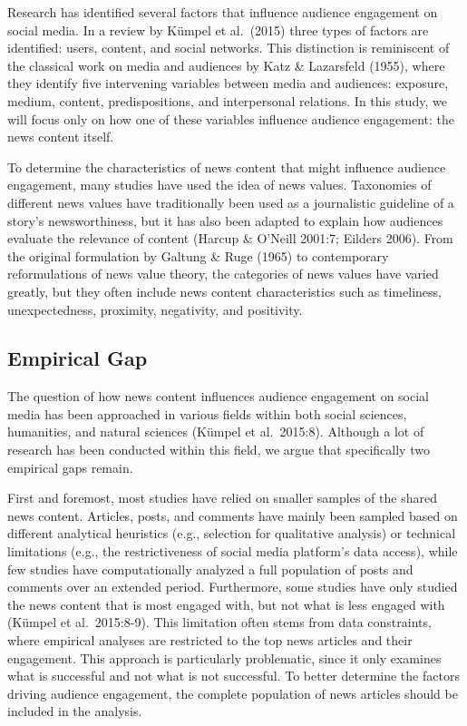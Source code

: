 \documentclass[
]{article}
\begin{document}
Research has identified several factors that influence audience
engagement on social media. In a review by Kümpel et al.~(2015) three
types of factors are identified: users, content, and social networks.
This distinction is reminiscent of the classical work on media and
audiences by Katz \& Lazarsfeld (1955), where they identify five
intervening variables between media and audiences: exposure, medium,
content, predispositions, and interpersonal relations. In this study, we
will focus only on how one of these variables influence audience
engagement: the news content itself.

To determine the characteristics of news content that might influence
audience engagement, many studies have used the idea of news values.
Taxonomies of different news values have traditionally been used as a
journalistic guideline of a story's newsworthiness, but it has also been
adapted to explain how audiences evaluate the relevance of content
(Harcup \& O'Neill 2001:7; Eilders 2006). From the original formulation
by Galtung \& Ruge (1965) to contemporary reformulations of news value
theory, the categories of news values have varied greatly, but they
often include news content characteristics such as timeliness,
unexpectedness, proximity, negativity, and positivity.

\hypertarget{empirical-gap}{%
\subsection{Empirical Gap}\label{empirical-gap}}

The question of how news content influences audience engagement on
social media has been approached in various fields within both social
sciences, humanities, and natural sciences (Kümpel et al.~2015:8).
Although a lot of research has been conducted within this field, we
argue that specifically two empirical gaps remain.

First and foremost, most studies have relied on smaller samples of the
shared news content. Articles, posts, and comments have mainly been
sampled based on different analytical heuristics (e.g., selection for
qualitative analysis) or technical limitations (e.g., the
restrictiveness of social media platform's data access), while few
studies have computationally analyzed a full population of posts and
comments over an extended period. Furthermore, some studies have only
studied the news content that is most engaged with, but not what is less
engaged with (Kümpel et al.~2015:8-9). This limitation often stems from
data constraints, where empirical analyses are restricted to the top
news articles and their engagement. This approach is particularly
problematic, since it only examines what is successful and not what is
not successful. To better determine the factors driving audience
engagement, the complete population of news articles should be included
in the analysis.
\end{document}
